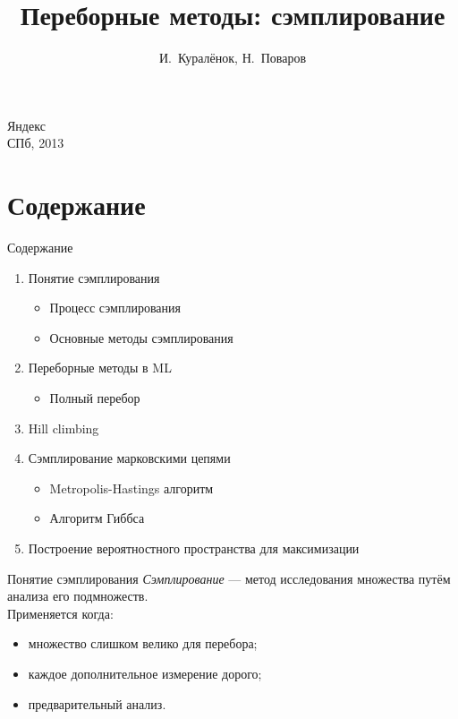 \documentclass[14pt, fleqn, xcolor={dvipsnames, table}]{beamer}
\title{Переборные методы: сэмплирование\\\small{}}
\author[]{\small{%
И.~Куралёнок,
Н.~Поваров}}
\date{}
\begin{document}
\begin{frame}
\maketitle
\small
\begin{center}
\vspace{-60pt}
\normalsize {\color{red}Я}ндекс \\
\vspace{80pt}
\footnotesize СПб, 2013
\end{center}
\end{frame}

\section{Содержание}
\begin{frame}{Содержание}
\begin{enumerate}
  \item Понятие сэмплирования
  \begin{itemize}
   \item Процесс сэмплирования
   \item Основные методы сэмплирования
  \end{itemize}
  \item Переборные методы в ML
  \begin{itemize}
   \item Полный перебор
  \end{itemize}
  \item Hill climbing
  \item Сэмплирование марковскими цепями
  \begin{itemize}
   \item Metropolis-Hastings алгоритм
   \item Алгоритм Гиббса
  \end{itemize}
  \item Построение вероятностного пространства для максимизации
\end{enumerate}
\end{frame}

\begin{frame}{Понятие сэмплирования}
\textit{Сэмплирование} --- метод исследования множества путём анализа его подмножеств. \\
Применяется когда:
\begin{itemize}
   \item множество слишком велико для перебора;
   \item каждое дополнительное измерение дорого;
   \item предварительный анализ.
\end{itemize}
\end{frame}
\end{document}
